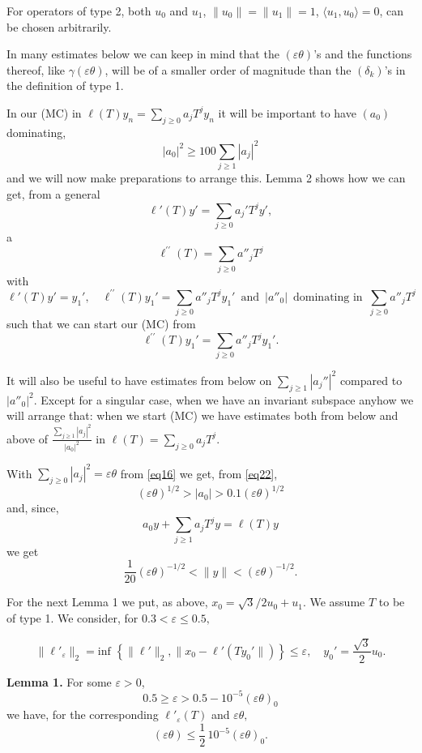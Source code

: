\documentclass[12pt,oneside,reqno]{amsart}
\theoremstyle{definition}
\begin{document}
For operators of type 2, both $u_0$ and $u_1$, $\|u_0\| = \|u_1\| = 1$, $\langle u_1, u_0\rangle = 0$, can be chosen arbitrarily.

In many estimates below we can keep in mind that the $(\varepsilon \theta)$'s and the functions thereof, like $\gamma (\varepsilon \theta)$, will be of a smaller order of magnitude than the $(\delta_k)$'s in the definition of type 1.

In our (MC) in $\ell (T) y_n = \sum_{j \ge 0} a_j T^j y_n$ it will be important to have $(a_0)$ dominating,
\begin{equation}\label{eq22}
	|a_0|^2 \ge 100 \sum_{j \ge 1} |a_j|^2
\end{equation}
and we will now make preparations to arrange this. Lemma 2 shows how we can get, from a general
$$\ell'(T) y' = \sum_{j \ge 0} a_j' T^j y',$$
a
$$\ell^{\prime \prime} (T) = \sum_{j \ge 0} a''_j T^j$$
with
$$\ell'(T)y' = y_1', \quad \ell^{\prime \prime} (T) y_1' = \sum_{j \ge 0} a''_j T^j y_1' \, \text{ and } \, |a''_0| \, \text{ dominating in } \, \sum_{j \ge 0} a''_j T^j$$
such that we can start our (MC) from 
$$ \ell^{\prime \prime} (T) y_1' = \sum_{j \ge 0} a''_j T^j y_1' .$$

It will also be useful to have estimates from below on $\sum_{j \ge 1}|a_j''|^2$ compared to $|a''_0|^2$. Except for a singular case, when we have an invariant subspace anyhow we will arrange that: when we start (MC) we have estimates both from below and above of $\displaystyle \frac{\sum_{j \ge 1}|a_j|^2}{|a_0|^2}$ in $\ell (T) = \sum_{j \ge 0} a_j T^j$.

With $\displaystyle \sum_{j \ge 0} |a_j|^2 = \varepsilon \theta$ from \eqref{eq16} we get, from \eqref{eq22}, $$\displaystyle (\varepsilon \theta)^{1/2} > |a_0| > 0.1 (\varepsilon \theta)^{1/2}$$ and, since, 
$$a_0 y + \sum_{j \ge 1} a_j T^j y = \ell (T) y$$
we get
\begin{equation}\label{eq23}
\frac{1}{20} (\varepsilon \theta)^{-1/2} < \| y \| < (\varepsilon \theta)^{-1/2}.
\end{equation}

For the next Lemma 1 we put, as above, $x_0 = \sqrt{3}/2 u_0 + u_1$. We assume $T$ to be of type 1. We consider, for $0.3 < \varepsilon \le 0.5,$

$$\| \ell'_{\varepsilon} \|_2 = \text{inf } \left\{ \|\ell'\|_2 , \|x_0 - \ell'(T y_0' \|)\right\}  \le \varepsilon, \quad y_0' = \frac{\sqrt{3}}{2} u_0.$$
\bigskip

\noindent \textbf{Lemma 1.} For some $\varepsilon > 0$, 
$$0.5 \ge \varepsilon > 0.5 - 10^{-5} (\varepsilon \theta)_0$$
we have, for the corresponding $\ell'_{\varepsilon}(T)$ and $\varepsilon \theta,$
$$(\varepsilon \theta) \le \frac{1}{2} \, 10^{-5} (\varepsilon \theta)_0.$$
\end{document}
